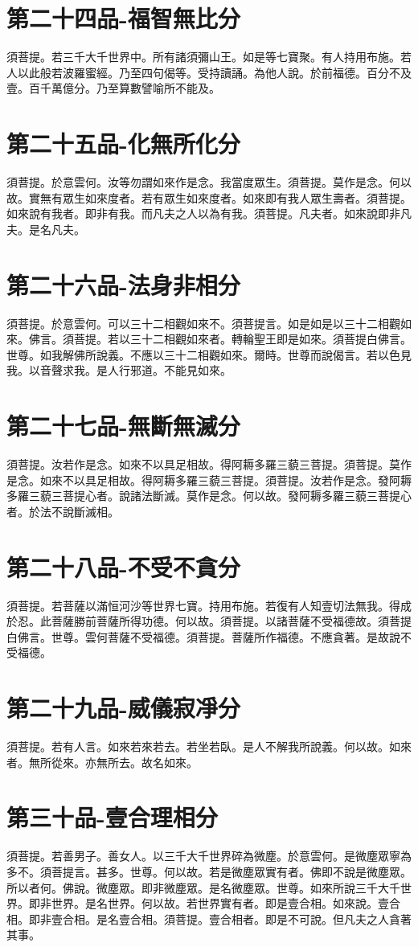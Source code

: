\documentclass[a6paper, 22pt, twocolumn]{cvertbook}
\begin{document}
\chapter{第二十四品-福智無比分}
\large 須菩提。若三千大千世界中。所有諸須彌山王。如是等七寶聚。有人持用布施。若人以此般若波羅蜜經。乃至四句偈等。受持讀誦。為他人說。於前福德。百分不及壹。百千萬億分。乃至算數譬喻所不能及。
\chapter{第二十五品-化無所化分}
\large 須菩提。於意雲何。汝等勿謂如來作是念。我當度眾生。須菩提。莫作是念。何以故。實無有眾生如來度者。若有眾生如來度者。如來即有我人眾生壽者。須菩提。如來說有我者。即非有我。而凡夫之人以為有我。須菩提。凡夫者。如來說即非凡夫。是名凡夫。
\chapter{第二十六品-法身非相分}
\large 須菩提。於意雲何。可以三十二相觀如來不。須菩提言。如是如是以三十二相觀如來。佛言。須菩提。若以三十二相觀如來者。轉輪聖王即是如來。須菩提白佛言。世尊。如我解佛所說義。不應以三十二相觀如來。爾時。世尊而說偈言。若以色見我。以音聲求我。是人行邪道。不能見如來。
\chapter{第二十七品-無斷無滅分}
\large 須菩提。汝若作是念。如來不以具足相故。得阿耨多羅三藐三菩提。須菩提。莫作是念。如來不以具足相故。得阿耨多羅三藐三菩提。須菩提。汝若作是念。發阿耨多羅三藐三菩提心者。說諸法斷滅。莫作是念。何以故。發阿耨多羅三藐三菩提心者。於法不說斷滅相。
\chapter{第二十八品-不受不貪分}
\large 須菩提。若菩薩以滿恒河沙等世界七寶。持用布施。若復有人知壹切法無我。得成於忍。此菩薩勝前菩薩所得功德。何以故。須菩提。以諸菩薩不受福德故。須菩提白佛言。世尊。雲何菩薩不受福德。須菩提。菩薩所作福德。不應貪著。是故說不受福德。
\chapter{第二十九品-威儀寂凈分}
\large 須菩提。若有人言。如來若來若去。若坐若臥。是人不解我所說義。何以故。如來者。無所從來。亦無所去。故名如來。
\chapter{第三十品-壹合理相分}
\large 須菩提。若善男子。善女人。以三千大千世界碎為微塵。於意雲何。是微塵眾寧為多不。須菩提言。甚多。世尊。何以故。若是微塵眾實有者。佛即不說是微塵眾。所以者何。佛說。微塵眾。即非微塵眾。是名微塵眾。世尊。如來所說三千大千世界。即非世界。是名世界。何以故。若世界實有者。即是壹合相。如來說。壹合相。即非壹合相。是名壹合相。須菩提。壹合相者。即是不可說。但凡夫之人貪著其事。
\end{document}
